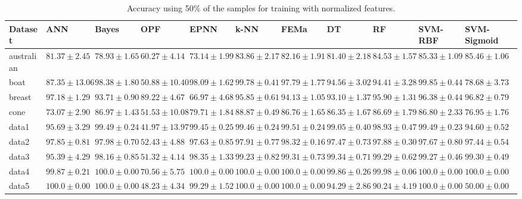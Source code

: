 \begin{sidewaystable}
\centering
\caption{\label{tab.ACC_1}Accuracy using 50\% of the samples for training with normalized features.}
\scriptsize
\begin{tabular}{l||l|l|l|l|l|l|l|l|l|l|}
Dataset & ANN & Bayes & OPF & EPNN & k-NN & FEMa & DT & RF &SVM-RBF & SVM-Sigmoid \\ \hline
australian& $81.37\pm2.45$& $78.93\pm1.65$& $60.27\pm4.14$& $73.14\pm1.99$& $83.86\pm2.17$& $82.16\pm1.91$& $81.40\pm2.18$& $84.53\pm1.57$& $\mathbf{85.33\pm1.09}$& $\mathbf{85.46\pm1.06}$\\ 
boat& $87.35\pm13.06$& $98.38\pm1.80$& $50.88\pm10.40$& $98.09\pm1.62$& $\mathbf{99.78\pm0.41}$& $97.79\pm1.77$& $94.56\pm3.02$& $94.41\pm3.28$& $\mathbf{99.85\pm0.44}$& $78.68\pm3.73$\\ 
breast& $\mathbf{97.18\pm1.29}$& $93.71\pm0.90$& $89.22\pm4.67$& $66.97\pm4.68$& $95.85\pm0.61$& $94.13\pm1.05$& $93.10\pm1.37$& $95.90\pm1.31$& $96.38\pm0.44$& $96.82\pm0.79$\\ 
cone& $73.07\pm2.90$& $86.97\pm1.43$& $51.53\pm10.08$& $79.71\pm1.84$& $\mathbf{88.87\pm0.49}$& $86.76\pm1.65$& $86.35\pm1.67$& $86.69\pm1.79$& $86.80\pm2.33$& $76.95\pm1.76$\\ 
data1& $95.69\pm3.29$& $\mathbf{99.49\pm0.24}$& $41.97\pm13.97$& $\mathbf{99.45\pm0.25}$& $\mathbf{99.46\pm0.24}$& $\mathbf{99.51\pm0.24}$& $99.05\pm0.40$& $98.93\pm0.47$& $\mathbf{99.49\pm0.23}$& $94.60\pm0.52$\\ 
data2& $97.85\pm0.81$& $97.98\pm0.70$& $52.43\pm4.88$& $97.63\pm0.85$& $97.91\pm0.77$& $\mathbf{98.32\pm0.16}$& $97.47\pm0.73$& $97.88\pm0.30$& $97.67\pm0.80$& $97.44\pm0.54$\\ 
data3& $95.39\pm4.29$& $98.16\pm0.85$& $51.32\pm4.14$& $98.35\pm1.33$& $\mathbf{99.23\pm0.82}$& $\mathbf{99.31\pm0.73}$& $\mathbf{99.34\pm0.71}$& $\mathbf{99.29\pm0.62}$& $\mathbf{99.27\pm0.46}$& $\mathbf{99.30\pm0.49}$\\ 
data4& $99.87\pm0.21$& $\mathbf{100.0\pm0.00}$& $70.56\pm5.75$& $\mathbf{100.0\pm0.00}$& $\mathbf{100.0\pm0.00}$& $\mathbf{100.0\pm0.00}$& $99.86\pm0.26$& $99.98\pm0.06$& $\mathbf{100.0\pm0.00}$& $\mathbf{100.0\pm0.00}$\\ 
data5& $\mathbf{100.0\pm0.00}$& $\mathbf{100.0\pm0.00}$& $48.23\pm4.34$& $99.29\pm1.52$& $\mathbf{100.0\pm0.00}$& $\mathbf{100.0\pm0.00}$& $94.29\pm2.86$& $90.24\pm4.19$& $\mathbf{100.0\pm0.00}$& $50.00\pm0.00$\\ 

\end{tabular}
\end{sidewaystable}
